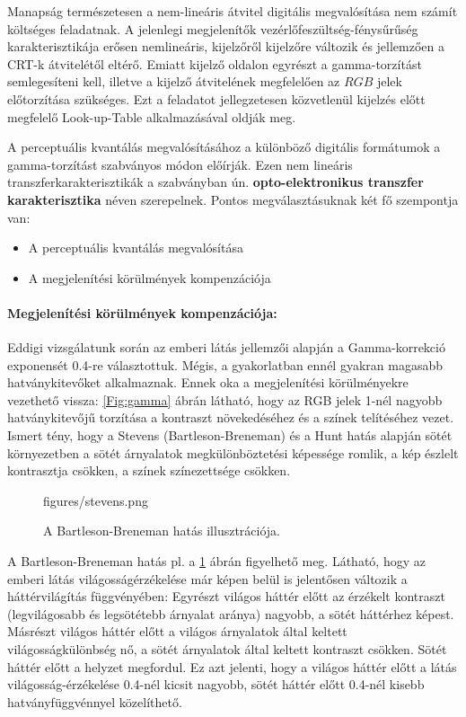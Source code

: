 \vspace{3mm}
Manapság természetesen a nem-lineáris átvitel digitális megvalósítása nem számít költséges feladatnak.
A jelenlegi megjelenítők vezérlőfeszültség-fénysűrűség karakterisztikája erősen nemlineáris, kijelzőről kijelzőre változik és jellemzően a CRT-k átvitelétől eltérő.
Emiatt kijelző oldalon egyrészt a gamma-torzítást semlegesíteni kell, illetve a kijelző átvitelének megfelelően az $RGB$ jelek előtorzítása szükséges.
Ezt a feladatot jellegzetesen közvetlenül kijelzés előtt megfelelő Look-up-Table alkalmazásával oldják meg.

\vspace{3mm}
A perceptuális kvantálás megvalósításához a különböző digitális formátumok a gamma-torzítást szabványos módon előírják.
Ezen nem lineáris transzferkarakterisztikák a szabványban ún. \textbf{opto-elektronikus transzfer karakterisztika} néven szerepelnek.
Pontos megválasztásuknak két fő szempontja van:
\begin{itemize}
\item A perceptuális kvantálás megvalósítása
\item A megjelenítési körülmények kompenzációja
\end{itemize}

\paragraph{Megjelenítési körülmények kompenzációja:\\}
Eddigi vizsgálatunk során az emberi látás jellemzői alapján a Gamma-korrekció exponensét 0.4-re választottuk.
Mégis, a gyakorlatban ennél gyakran magasabb hatványkitevőket alkalmaznak.
Ennek oka a megjelenítési körülményekre vezethető vissza: \ref{Fig:gamma} ábrán látható, hogy az RGB jelek 1-nél nagyobb hatványkitevőjű torzítása a kontraszt növekedéséhez és a színek telítéséhez vezet.
Ismert tény, hogy a Stevens (Bartleson-Breneman) és a Hunt hatás alapján sötét környezetben a sötét árnyalatok megkülönböztetési képessége romlik, a kép észlelt kontrasztja csökken, a színek színezettsége csökken.
%
\begin{figure}[]
	\centering
	\begin{overpic}[width = 1\columnwidth ]{figures/stevens.png}
	\end{overpic}
	\caption{A Bartleson-Breneman hatás illusztrációja.}
	\label{Fig:stevens_effect}
\end{figure}
A Bartleson-Breneman hatás pl. a \ref{Fig:stevens_effect} ábrán figyelhető meg.
Látható, hogy az emberi látás világosságérzékelése már képen belül is jelentősen változik a háttérvilágítás függvényében:
Egyrészt világos háttér előtt az érzékelt kontraszt (legvilágosabb és legsötétebb árnyalat aránya) nagyobb, a sötét háttérhez képest.
Másrészt világos háttér előtt a világos árnyalatok által keltett világosságkülönbség nő, a sötét árnyalatok által keltett kontraszt csökken.
Sötét háttér előtt a helyzet megfordul.
Ez azt jelenti, hogy a világos háttér előtt a látás világosság-érzékelése 0.4-nél kicsit nagyobb, sötét háttér előtt 0.4-nél kisebb hatványfüggvénnyel közelíthető.

